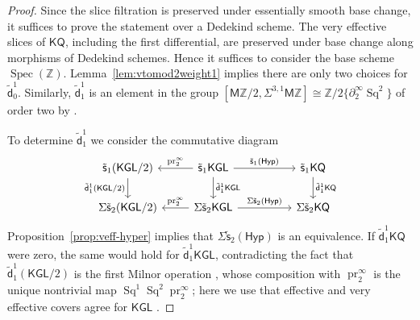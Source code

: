 \documentclass[11pt,hyp,english]{article}
\newcommand{\Z}{\mathbb{Z}}
\newcommand{\KGL}{\mathsf{KGL}}
\newcommand{\KQ}{\mathsf{KQ}}
\newcommand{\MZ}{\mathsf{M}\Z}
\newcommand{\Spec}{\operatorname{Spec}}
\newcommand{\Sq}{\operatorname{Sq}}
\newcommand{\pr}{\operatorname{pr}}
\newcommand{\vs}{\tilde{\mathsf{s}}}
\newcommand{\vd}{{\tilde{\mathsf{d}}}}
\newcommand{\Hyper}{\mathsf{Hyp}}
\theoremstyle{definition}
\begin{document}
\begin{proof}
Since the slice filtration is preserved under essentially smooth base change, it suffices to prove the statement over a Dedekind scheme.
The very effective slices of $\KQ$, including the first differential, are preserved under base change along morphisms of Dedekind schemes.
Hence it suffices to consider the base scheme $\Spec(\Z)$.
Lemma~\ref{lem:vtomod2weight1} implies there are only two choices for $\vd_0^1$.
Similarly, 
$\vd_1^1$ is an element in the group $[\MZ/2,\Sigma^{3,1}\MZ]\cong \Z/2\{\partial^\infty_2\Sq^2\}$ 
of order two by . 

To determine $\vd^1_1$ we consider the commutative diagram
\[
\begin{tikzcd}
\vs_1(\KGL/2)\ar[d,"\vd^1_1(\KGL/2)"'] & 
\vs_1\KGL \ar[rr,"\vs_1(\Hyper)"] \ar[d,"\vd^1_1\KGL"] \ar[l,"\pr^\infty_2"'] && 
\vs_1\KQ  \ar[d,"\vd^1_1\KQ "] \\
\Sigma\vs_2(\KGL/2) &
\Sigma\vs_2\KGL \ar[rr,"\Sigma\vs_2(\Hyper)"] \ar[l,"\pr^\infty_2"'] && 
\Sigma\vs_2\KQ 
\end{tikzcd}
\]
Proposition~\ref{prop:veff-hyper} implies that $\Sigma \vs_2(\Hyper)$ is an equivalence.
If $\vd^1_1 \KQ$ were zero, the same would hold for $\vd^1_1 \KGL$, contradicting the fact that $\vd^1_1(\KGL/2)$ is the first Milnor operation \cite[Lemma 5.1]{RO:slices}, whose composition with $\pr^\infty_2$ is the unique nontrivial map $\Sq^1 \Sq^2 \pr^\infty_2$; here we use that effective and very effective covers agree for $\KGL$ \cite[Lemma 4]{aro}.


\end{proof}
\end{document}
